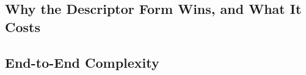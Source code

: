 %

\subsection{Why the Descriptor Form Wins, and What It Costs}
\label{sec:disc-tradeoff}

\subsection{End-to-End Complexity}
\label{sec:disc-complexity}

